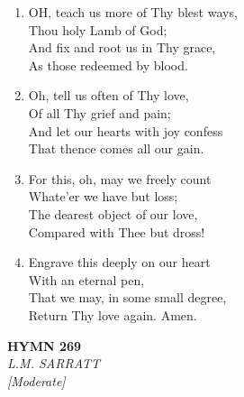 \documentclass[11pt,a4paper]{article}
\begin{document}
\begin{enumerate}
    \item OH, teach us more of Thy blest ways, \\
        Thou holy Lamb of God; \\
        And fix and root us in Thy grace, \\
        As those redeemed by blood.

    \item Oh, tell us often of Thy love, \\
        Of all Thy grief and pain; \\
        And let our hearts with joy confess \\
        That thence comes all our gain.

    \item For this, oh, may we freely count \\
        Whate'er we have but loss; \\
        The dearest object of our love, \\
        Compared with Thee but dross!

    \item Engrave this deeply on our heart \\
        With an eternal pen, \\
        That we may, in some small degree, \\
        Return Thy love again. Amen.

\end{enumerate}

\newpage
\begin{center}
    {\Large \textbf{HYMN 269}}
    \\
    \textit{L.M. SARRATT}
    \\
    \textit{\small [Moderate]}
\end{center}
\vspace{1em}
\end{document}
